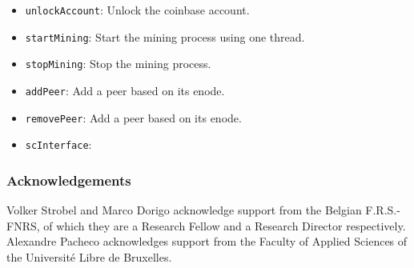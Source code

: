 \documentclass{article}
\begin{document}
\begin{itemize}
\item \texttt{unlockAccount}: Unlock the coinbase account.
\item \texttt{startMining}: Start the mining process using one thread.
\item \texttt{stopMining}: Stop the mining process.
\item \texttt{addPeer}: Add a peer based on its enode.
\item \texttt{removePeer}: Add a peer based on its enode.
\item \texttt{scInterface}: 
\end{itemize}

\subsubsection*{Acknowledgements}

Volker Strobel and Marco Dorigo acknowledge support from the Belgian
F.R.S.-FNRS, of which they are a Research Fellow and a Research
Director respectively. Alexandre Pacheco acknowledges support from the
Faculty of Applied Sciences of the Universit\'{e} Libre de Bruxelles.




\end{document}
